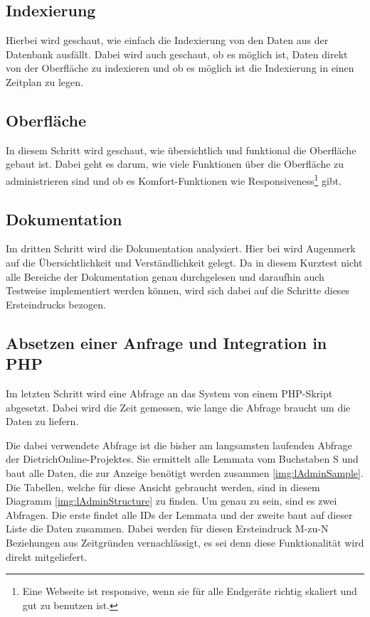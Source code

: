 \subsection{Indexierung}

Hierbei wird geschaut, wie einfach die Indexierung von den Daten aus der Datenbank ausfällt. Dabei wird auch geschaut, ob es möglich ist, Daten direkt von der Oberfläche zu indexieren und ob es möglich ist die Indexierung in einen Zeitplan zu legen.

\subsection{Oberfläche}
In diesem Schritt wird geschaut, wie übersichtlich und funktional die Oberfläche gebaut ist. Dabei geht es darum, wie viele Funktionen über die Oberfläche zu administrieren sind und ob es Komfort-Funktionen wie Responsiveness\footnote{Eine Webseite ist responsive, wenn sie für alle Endgeräte richtig skaliert und gut zu benutzen ist.} gibt.

\subsection{Dokumentation}

Im dritten Schritt wird die Dokumentation analysiert. Hier  bei wird Augenmerk auf die Übersichtlichkeit und Verständlichkeit gelegt. Da in diesem Kurztest nicht alle Bereiche der Dokumentation genau durchgelesen und daraufhin auch Testweise implementiert werden können, wird sich dabei auf die Schritte dieses Ersteindrucks bezogen.

\subsection{Absetzen einer Anfrage und Integration in PHP}

Im letzten Schritt wird eine Abfrage an das System von einem PHP-Skript abgesetzt. Dabei wird die Zeit gemessen, wie lange die Abfrage braucht um die Daten zu liefern.

Die dabei verwendete Abfrage ist die bisher am langsamsten laufenden Abfrage der DietrichOnline-Projektes. Sie ermittelt alle Lemmata vom Buchstaben S und baut alle Daten, die zur Anzeige benötigt werden zusammen \ref{img:lAdminSample}. Die Tabellen, welche für diese Ansicht gebraucht werden, sind in diesem Diagramm \ref{img:lAdminStructure} zu finden. Um genau zu sein, sind es zwei Abfragen. Die erste findet alle IDs der Lemmata und der zweite baut auf dieser Liste die Daten zusammen. Dabei werden für diesen Ersteindruck M-zu-N Beziehungen aus Zeitgründen vernachlässigt, es sei denn diese Funktionalität wird direkt mitgeliefert.

